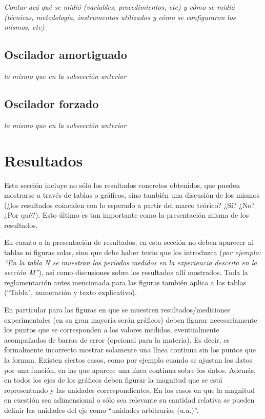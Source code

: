 \documentclass[12pt,a4paper]{article}
\begin{document}
\textit{Contar acá qué se midió (variables, procedimientos, etc) y cómo se midió (técnicas, metodología, instrumentos utilizados y cómo se configuraron los mismos, etc)}

\subsection{Oscilador amortiguado}

\textit{lo mismo que en la subsección anterior}

\subsection{Oscilador forzado}

\textit{lo mismo que en la subsección anterior}


\section{Resultados}

Esta sección incluye no sólo los resultados concretos obtenidos, que pueden mostrarse a través de tablas o gráficos, sino también una discusión de los mismos (¿los resultados coinciden con lo esperado a partir del marco teórico? ¿Sí? ¿No? ¿Por qué?). Esto último es tan importante como la presentación misma de los resultados.

En cuanto a la presentación de resultados, en esta sección no deben aparecer ni tablas ni figuras solas, sino que debe haber texto que los introduzca (\textit{por ejemplo: “En la tabla N se muestran los períodos medidos en la experiencia descrita en la sección M”}), así como discusiones sobre los resultados allí mostrados. Toda la reglamentación antes mencionada para las figuras también aplica a las tablas (“Tabla", numeración y texto explicativo).

En particular para las figuras en que se muestren resultados/mediciones experimentales (en su gran mayoría serán gráficos) deben figurar necesariamente los puntos que se corresponden a los valores medidos, eventualmente acompañados de barras de error (opcional para la materia). Es decir, es formalmente incorrecto mostrar solamente una línea continua sin los puntos que la forman. Existen ciertos casos, como por ejemplo cuando se ajustan los datos por una función, en las que aparece una línea continua sobre los datos. Además, en todos los ejes de los gráficos deben figurar la magnitud que se está representando y las unidades correspondientes. En los casos en que la magnitud en cuestión sea adimensional o sólo sea relevante su cantidad relativa se pueden definir las unidades del eje como “unidades arbitrarias (u.a.)''.
\end{document}
